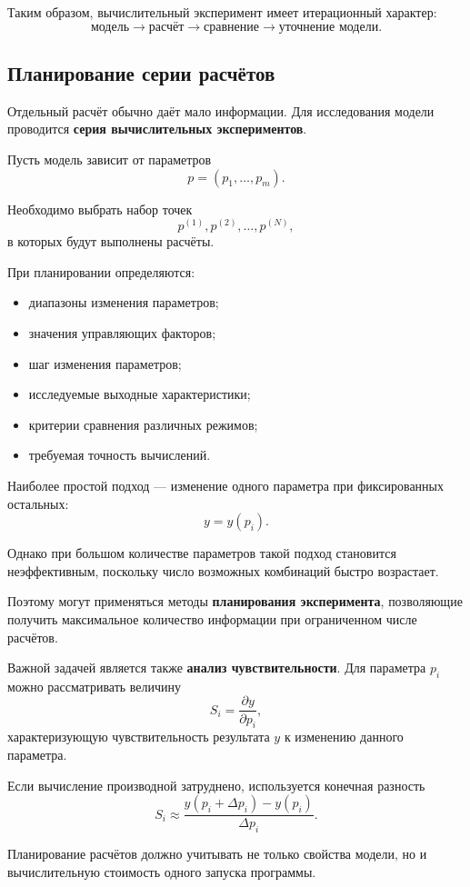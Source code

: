 Таким образом, вычислительный эксперимент имеет итерационный характер:
\[
\text{модель}
\rightarrow
\text{расчёт}
\rightarrow
\text{сравнение}
\rightarrow
\text{уточнение модели}.
\]


\subsection{Планирование серии расчётов}

Отдельный расчёт обычно даёт мало информации. Для исследования модели проводится \textbf{серия вычислительных экспериментов}.

Пусть модель зависит от параметров
\[
p=(p_1,\ldots,p_m).
\]

Необходимо выбрать набор точек
\[
p^{(1)},p^{(2)},\ldots,p^{(N)},
\]
в которых будут выполнены расчёты.

При планировании определяются:
\begin{itemize}
	\item диапазоны изменения параметров;
	\item значения управляющих факторов;
	\item шаг изменения параметров;
	\item исследуемые выходные характеристики;
	\item критерии сравнения различных режимов;
	\item требуемая точность вычислений.
\end{itemize}

Наиболее простой подход --- изменение одного параметра при фиксированных остальных:
\[
y=y(p_i).
\]

Однако при большом количестве параметров такой подход становится неэффективным, поскольку число возможных комбинаций быстро возрастает.

Поэтому могут применяться методы \textbf{планирования эксперимента}, позволяющие получить максимальное количество информации при ограниченном числе расчётов.

Важной задачей является также \textbf{анализ чувствительности}. Для параметра $p_i$ можно рассматривать величину
\[
S_i =
\frac{\partial y}{\partial p_i},
\]
характеризующую чувствительность результата $y$ к изменению данного параметра.

Если вычисление производной затруднено, используется конечная разность
\[
S_i
\approx
\frac{y(p_i+\Delta p_i)-y(p_i)}
{\Delta p_i}.
\]

Планирование расчётов должно учитывать не только свойства модели, но и вычислительную стоимость одного запуска программы.



